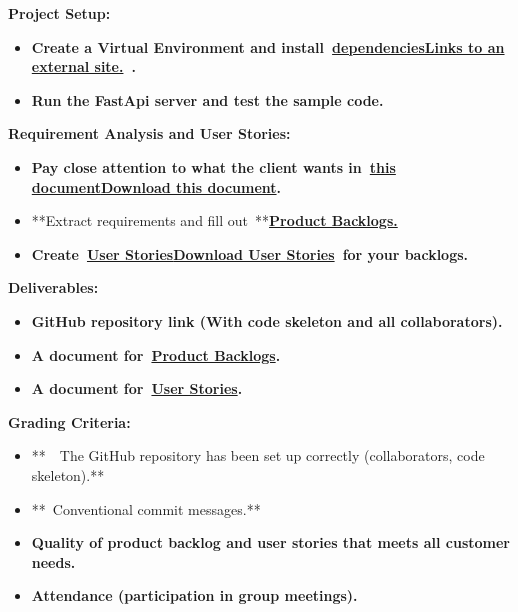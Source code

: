 \documentclass[
]{article}
\providecommand{\tightlist}{%
  \setlength{\itemsep}{0pt}\setlength{\parskip}{0pt}}
\begin{document}
\textbf{Project Setup:}

\begin{itemize}
\tightlist
\item
  \textbf{Create a Virtual Environment and
  install~\textbf{\href{https://github.com/samfallahian/ITSC3155-Assignments/blob/main/FinalProject/README.md}{\textbf{dependenciesLinks
  to an external site.}}}~.}
\item
  \textbf{Run the FastApi server and test the sample code.}
\end{itemize}

\textbf{Requirement Analysis and User Stories:}

\begin{itemize}
\tightlist
\item
  \textbf{Pay close attention to what the client wants
  in~\textbf{\href{https://instructure.charlotte.edu/courses/264138/files/33808470?wrap=1}{\textbf{this
  document}}\href{https://instructure.charlotte.edu/courses/264138/files/33808470/download?download_frd=1}{\textbf{Download
  this document}}}.}
\item
  **Extract requirements and fill
  out~**\href{https://instructure.charlotte.edu/courses/264138/files/33808457?wrap=1}{\textbf{Product
  Backlogs.}}
\item
  \textbf{Create~\textbf{\href{https://instructure.charlotte.edu/courses/264138/files/33808471?wrap=1}{\textbf{User
  Stories}}\href{https://instructure.charlotte.edu/courses/264138/files/33808471/download?download_frd=1}{\textbf{Download
  User Stories}}}~for your backlogs.}
\end{itemize}

\textbf{Deliverables:}

\begin{itemize}
\tightlist
\item
  \textbf{GitHub repository link (With code skeleton and all
  collaborators).}
\item
  \textbf{A document
  for~\textbf{\href{https://instructure.charlotte.edu/courses/264138/files/33808457?wrap=1}{\textbf{Product
  Backlogs}}}.}
\item
  \textbf{A document
  for~\textbf{\href{https://instructure.charlotte.edu/courses/264138/files/33808471?wrap=1}{\textbf{User
  Stories}}}.}
\end{itemize}

\textbf{Grading Criteria:}

\begin{itemize}
\tightlist
\item
  **~~The GitHub repository has been set up correctly (collaborators,
  code skeleton).**
\item
  **~Conventional commit messages.**
\item
  \textbf{Quality of product backlog and user stories that meets all
  customer needs.}
\item
  \textbf{Attendance (participation in group meetings).}
\end{itemize}
\end{document}
